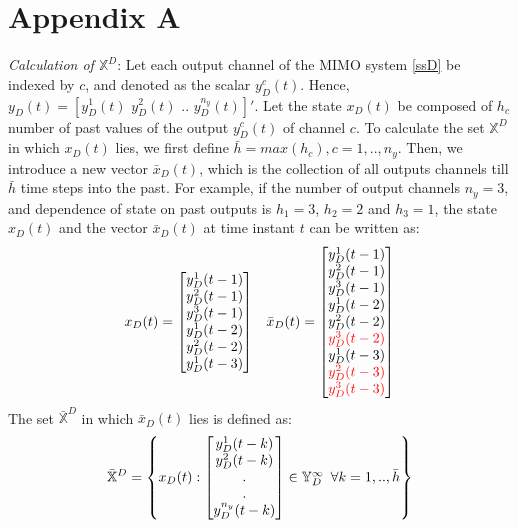 \documentclass[letterpaper, 10 pt, conference]{ieeeconf}  %
\begin{document}
\section*{Appendix A}
\vspace{-10pt}
\noindent
\textit{Calculation of $\mathbb{X}^D$}: 
Let each output channel of the MIMO system \eqref{ssD} be indexed by $c$, and denoted as the scalar $y_D^c(t)$. Hence, $y_D(t)=[y_D^1(t) \hspace{4pt} y_D^2(t) \hspace{4pt} .. \hspace{4pt} y_D^{n_y}(t)]'$. Let the state $x_D(t)$ be composed of $h_c$ number of past values of the output $y_D^c(t)$ of channel $c$. 
To calculate the set $\mathbb{X}^D$ in which $x_D(t)$ lies, we first define $\bar{h}=max(h_c), c=1,..,n_y $. Then, we introduce a new vector $\bar{x}_D(t)$, which is the collection of all outputs channels till $\bar{h}$ time steps into the past. For example, if the number of output channels $n_y=3$, and dependence of state on past outputs is $h_1=3$, $h_2=2$ and $h_3=1$, the state $x_D(t)$ and the vector $\bar{x}_D(t)$ at time instant $t$ can be written as:
\begin{equation}
\small
\begin{matrix}
x_D(t) = \begin{bmatrix}
y_D^1(t-1) \\ y_D^2(t-1) \\ y_D^3(t-1) \\ y_D^1(t-2) \\ y_D^2(t-2) \\ y_D^1(t-3)
\end{bmatrix}
& 
\bar{x}_D(t) = \begin{bmatrix}
y_D^1(t-1) \\ y_D^2(t-1) \\ y_D^3(t-1) \\ y_D^1(t-2) \\ y_D^2(t-2) \\ \textcolor{red}{y_D^3(t-2)} \\ y_D^1(t-3) \\ \textcolor{red}{y_D^2(t-3)} \\ \textcolor{red}{y_D^3(t-3)}
\end{bmatrix}
\end{matrix}
\end{equation}
The set $\bar{\mathbb{X}}^D$ in which $\bar{x}_D(t)$ lies is defined as:
\begin{equation}
\small
\bar{\mathbb{X}}^D = \begin{Bmatrix}x_D(t): \begin{bmatrix} y_D^1(t-k) \\ y_D^2(t-k) \\ . \\ . \\ y_D^{n_y}(t-k) \end{bmatrix} \in \mathbb{Y}_D^{\infty} \hspace{5pt} \forall k=1,..,\bar{h} \end{Bmatrix}
\end{equation}
\end{document}

